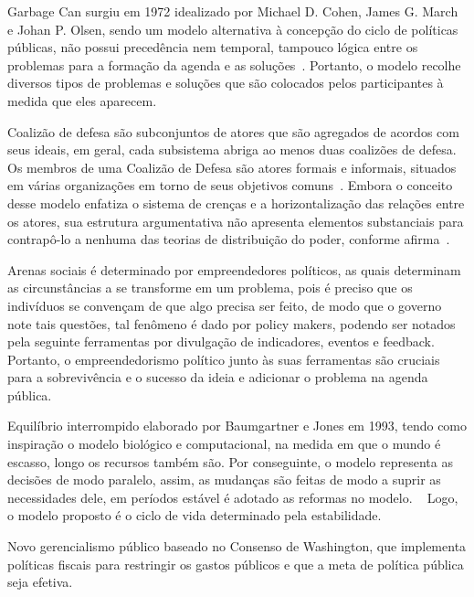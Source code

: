 Garbage Can surgiu em 1972 idealizado por Michael D. Cohen, James G. March e Johan P. Olsen, sendo um modelo alternativa à concepção do ciclo de políticas públicas, não possui precedência nem temporal, tampouco lógica entre os problemas para a formação da agenda  e as soluções~\cite{rua2013}.
Portanto, o modelo recolhe diversos tipos de problemas e soluções que são colocados pelos participantes à medida que eles aparecem.


Coalizão de defesa são subconjuntos de atores que são agregados de acordos com seus ideais, em geral, cada subsistema abriga ao menos duas coalizões de defesa.
Os membros de uma Coalizão de Defesa são atores formais e informais, situados em várias organizações em torno de seus objetivos comuns~\cite{rua2013}.
Embora o conceito desse modelo enfatiza o sistema de crenças e a horizontalização das relações entre os atores, sua estrutura argumentativa não apresenta elementos substanciais para contrapô-lo a nenhuma das teorias de distribuição do poder, conforme afirma~.


Arenas sociais é determinado por empreendedores políticos, as quais determinam as circunstâncias a se transforme em um problema, pois é preciso que os indivíduos se convençam de que algo precisa ser feito, de modo que o governo note tais questões, tal fenômeno é dado por policy makers, podendo ser notados pela seguinte ferramentas por divulgação de indicadores, eventos e  feedback.
Portanto, o empreendedorismo político junto às suas ferramentas são cruciais para a sobrevivência e o sucesso da ideia e adicionar o problema na agenda pública.


Equilíbrio interrompido elaborado por Baumgartner e Jones em 1993, tendo como inspiração o modelo biológico e computacional, na medida em que o mundo é escasso, longo os recursos também são. 
Por conseguinte, o modelo representa as decisões de modo paralelo, assim, as mudanças são feitas de modo a suprir as necessidades dele, em períodos estável é adotado as reformas no modelo.  
Logo, o modelo proposto é o ciclo de vida determinado pela estabilidade.


Novo gerencialismo público baseado no Consenso de Washington, que implementa políticas fiscais para restringir os gastos públicos e que a meta de política pública seja efetiva.
